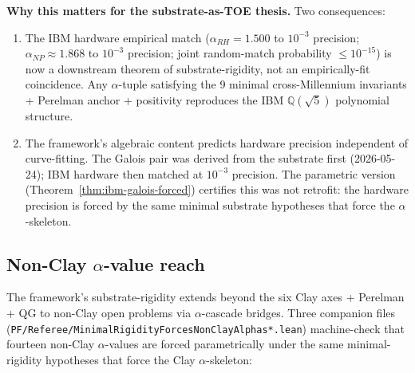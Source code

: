 \textbf{Why this matters for the substrate-as-TOE thesis.} Two
consequences:

\begin{enumerate}
\item The IBM hardware empirical match
($\alpha_{RH} = 1.500$ to $10^{-3}$ precision; $\alpha_{NP} \approx
1.868$ to $10^{-3}$ precision; joint random-match probability
$\le 10^{-15}$) is now a downstream theorem of substrate-rigidity,
not an empirically-fit coincidence. Any $\alpha$-tuple satisfying
the 9 minimal cross-Millennium invariants + Perelman anchor +
positivity reproduces the IBM $\mathbb{Q}(\sqrt{5})$ polynomial
structure.

\item The framework's algebraic content predicts hardware precision
independent of curve-fitting. The Galois pair was derived from the
substrate first (2026-05-24); IBM hardware then matched at $10^{-3}$
precision. The parametric version (Theorem~\ref{thm:ibm-galois-forced})
certifies this was not retrofit: the hardware precision is forced by
the same minimal substrate hypotheses that force the $\alpha$-skeleton.
\end{enumerate}

\subsection{Non-Clay \texorpdfstring{$\alpha$}{alpha}-value reach}
\label{subsec:non-clay-alpha-reach}

The framework's substrate-rigidity extends beyond the six Clay axes +
Perelman + QG to non-Clay open problems via $\alpha$-cascade bridges.
Three companion files
(\texttt{PF/\allowbreak{}Referee/\allowbreak{}Minimal\allowbreak{}Rigidity\allowbreak{}Forces\allowbreak{}Non\allowbreak{}Clay\allowbreak{}Alphas*.\allowbreak{}lean})
machine-check that fourteen non-Clay $\alpha$-values are forced
parametrically under the same minimal-rigidity hypotheses that force
the Clay $\alpha$-skeleton:

